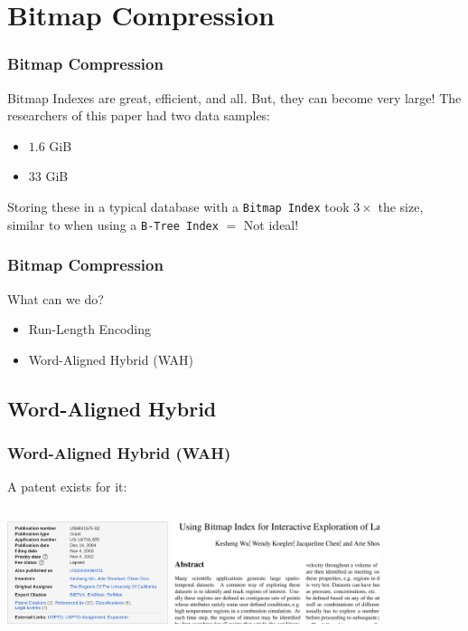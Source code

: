 \documentclass[11pt]{beamer}
\begin{document}
\section[Bitmap Compression]{Bitmap Compression}
\begin{frame}
	\frametitle{Bitmap Compression}
	
	Bitmap Indexes are great, efficient, and all. But, they can become very large!
	\pause
	The researchers of this paper had two data samples:
	\begin{itemize}
		\pause
		\item $1.6$ GiB
		\pause
		\item $33$ GiB
	\end{itemize}
	
	\pause
	Storing these in a typical database with a \texttt{Bitmap Index} took $3\times$ the size, similar to when using a \texttt{B-Tree Index} \pause $=$ Not ideal!
\end{frame}

\begin{frame}
	\frametitle{Bitmap Compression}
	
	What can we do?
	\begin{itemize}
		\pause
		\item Run-Length Encoding
		\pause
		\item Word-Aligned Hybrid (WAH)
	\end{itemize}
\end{frame}

\subsection[Word-Aligned Hybrid]{Word-Aligned Hybrid}
\begin{frame}
	\frametitle{Word-Aligned Hybrid (WAH)}
	
	A patent exists for it:
	\begin{columns}[c]
		\column{4cm}
		\includegraphics[height=3cm]{patent.png}\footnotemark
		\column{6cm}
		\pause
		\includegraphics[height=3cm]{paper2.png}\footnotemark
	\end{columns}
	
\end{frame}
\end{document}

